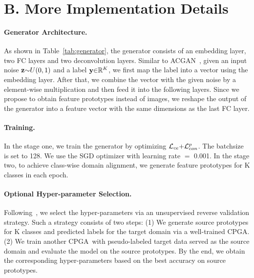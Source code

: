 \documentclass{article}
\def\ournet{CPGA}
\begin{document}
\section*{B. More Implementation Details} \label{sec:implement}

\paragraph{Generator Architecture.}

As shown in Table~\ref{tab:generator}, the generator consists of an embedding layer, two FC layers and two deconvolution layers. 
Similar to ACGAN~\cite{odena2017conditional}, given an input noise $\textbf{z}\small{\sim} U(0,1)$ and a label $\textbf{y}\small{\in}\mathbb{R}^K$, we first map the label into a vector using the embedding layer. After that, we combine the vector with the given noise by a element-wise multiplication and then feed it into the following layers.
Since we propose to obtain feature prototypes instead of images, we reshape the output of the generator into a feature vector with the same dimensions as the last FC layer.


\paragraph{Training.}

In the stage one, we train the generator by optimizing $\mathcal{L}_{ce}\small{+}\mathcal{L}_{con}^{p}$.
The batchsize is set to 128.
We use the SGD optimizer with learning rate $=$ 0.001.
In the stage two, to achieve class-wise domain alignment, we generate feature prototypes for K classes in each epoch. 


\paragraph{Optional Hyper-parameter Selection.} 
Following~\cite{ganin2016domain}, we select the hyper-parameters via an unsupervised reverse validation strategy. Such a strategy consists of two steps: (1) We generate source prototypes for K classes and predicted labels for the target domain via a well-trained \ournet. (2) We train another \ournet~with pseudo-labeled target data served as the source domain and evaluate the model on the source prototypes. By the end, we obtain the corresponding hyper-parameters based on the best accuracy on source prototypes.
\end{document}
